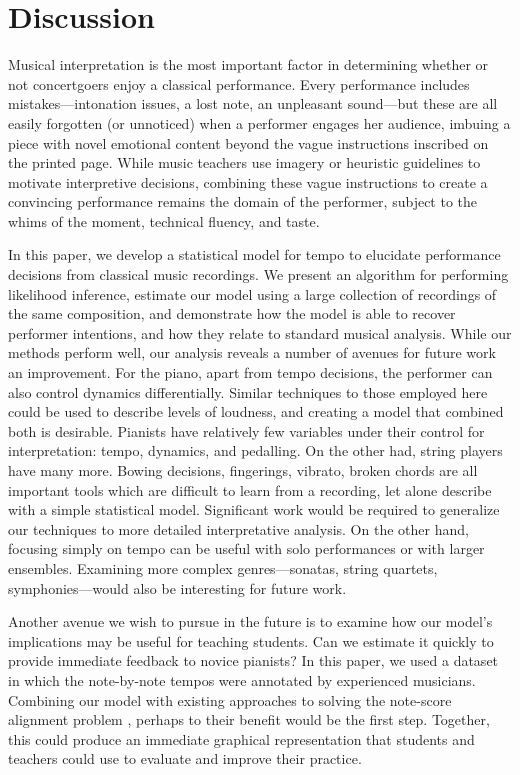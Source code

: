 \documentclass[12pt]{article}
\begin{document}
\section{Discussion}
\label{sec:discussion}


Musical interpretation is the most important factor 
in determining whether or not concertgoers enjoy a classical performance. Every
performance includes mistakes---intonation issues, a lost note, an
unpleasant sound---but these are all easily forgotten (or unnoticed) when a performer
engages her audience, imbuing a piece with novel emotional content
beyond the vague instructions inscribed on the printed page. While music teachers use
imagery or heuristic guidelines to motivate interpretive decisions, combining these
vague instructions to create a convincing performance remains the domain
of the performer, subject to the whims of the moment, technical
fluency, and taste.

In this paper, we develop a statistical model for tempo to elucidate performance
decisions from classical music recordings. We present an algorithm for
performing likelihood inference, estimate our model using a large
collection of recordings of the same composition, and demonstrate how
the model is able to recover performer intentions, and how they relate
to standard musical analysis. While our methods perform well, our
analysis reveals a number of avenues for future work an
improvement. For the piano, apart from tempo decisions, the performer
can also control dynamics differentially. Similar techniques to those
employed here could be used to describe levels of loudness, and
creating a model that combined both is desirable. Pianists have
relatively few variables under their control for interpretation:
tempo, dynamics, and pedalling. On the other had, string players have
many more. Bowing decisions, fingerings, vibrato, broken chords are
all important tools which are difficult to learn from a recording, let
alone describe with a simple statistical model. Significant work would
be required to generalize our techniques to more detailed
interpretative analysis. On the other hand, focusing simply on tempo
can be useful with solo performances or with larger
ensembles. Examining more complex genres---sonatas, string quartets,
symphonies---would also be interesting for future work.

Another avenue we wish to pursue in the future is to examine how our
model's implications may be useful for teaching students. Can we
estimate it quickly to provide immediate feedback to novice pianists?
In this paper, we used a dataset in which the note-by-note tempos were
annotated by experienced musicians. Combining our model with existing
approaches to solving the note-score alignment problem
\citep{LangFreitas2005,Raphael2002,DannenbergRaphael2006}, perhaps to
their benefit would be the first step. Together, this could produce an
immediate graphical representation that students and teachers could
use to evaluate and improve their practice.
\end{document}
